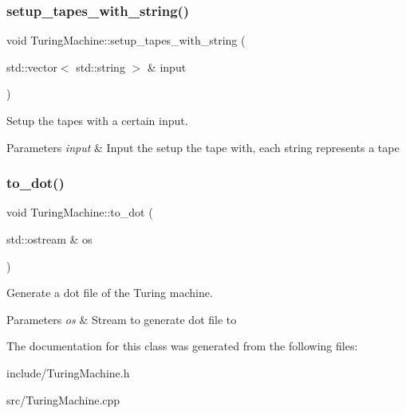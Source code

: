 \subsubsection{\texorpdfstring{setup\+\_\+tapes\+\_\+with\+\_\+string()}{setup\_tapes\_with\_string()}}
{\footnotesize\ttfamily void Turing\+Machine\+::setup\+\_\+tapes\+\_\+with\+\_\+string (\begin{DoxyParamCaption}\item[{std\+::vector$<$ std\+::string $>$ \&}]{input }\end{DoxyParamCaption})}



Setup the tapes with a certain input. 


\begin{DoxyParams}{Parameters}
{\em input} & Input the setup the tape with, each string represents a tape \\
\hline
\end{DoxyParams}
\mbox{\label{classTuringMachine_abd6288a60955a8b1b2d0f58d0b3d63da}} 
\subsubsection{\texorpdfstring{to\+\_\+dot()}{to\_dot()}}
{\footnotesize\ttfamily void Turing\+Machine\+::to\+\_\+dot (\begin{DoxyParamCaption}\item[{std\+::ostream \&}]{os }\end{DoxyParamCaption})}



Generate a dot file of the Turing machine. 


\begin{DoxyParams}{Parameters}
{\em os} & Stream to generate dot file to \\
\hline
\end{DoxyParams}


The documentation for this class was generated from the following files\+:\begin{DoxyCompactItemize}
\item 
include/Turing\+Machine.\+h\item 
src/Turing\+Machine.\+cpp\end{DoxyCompactItemize}
